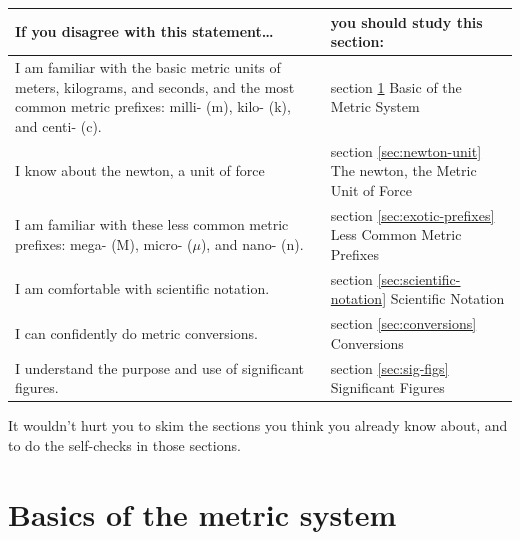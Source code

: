 \begin{center}
\noindent\begin{tabular}{|p{60mm}|p{60mm}|}
\hline
\textbf{If you disagree with this statement\ldots} & \textbf{you should study this section:}\\
\hline
I am familiar with the basic metric units of meters, kilograms, and seconds, and the most
common metric prefixes: milli- (m), kilo- (k), and centi- (c). & section \ref{sec:metric-basics} Basic of the Metric System \\
\hline
I know about the newton, a unit of force & section \ref{sec:newton-unit} The newton, the Metric Unit of Force\\
\hline
I am familiar with these less common metric prefixes: mega- (M), micro- ($\mu$), and nano- (n). &
section \ref{sec:exotic-prefixes} Less Common Metric Prefixes \\
\hline
I am comfortable with scientific notation. & section \ref{sec:scientific-notation} Scientific Notation \\
\hline
I can confidently do metric conversions. & section \ref{sec:conversions} Conversions \\
\hline
I understand the purpose and use of significant figures. & section \ref{sec:sig-figs} Significant Figures \\
\hline
\end{tabular}
\end{center}
\noindent It wouldn't hurt you to skim the sections you think you
already know about, and to do the self-checks in those sections.

\section{Basics of the metric system}\label{sec:metric-basics}

